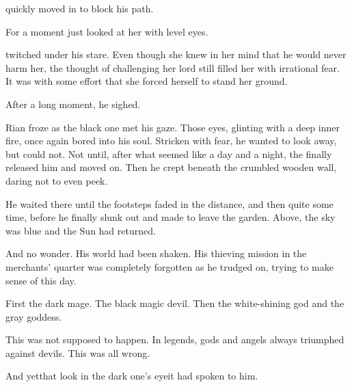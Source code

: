 \begin{garbage}
\Criseis{} quickly moved in to block his path.

For a moment \Ishnaruchaefir{} just looked at her with level eyes. 

\Criseis{} twitched under his stare. 
Even though she knew in her mind that he would never harm her, the thought of challenging her lord still filled her with irrational fear. 
It was with some effort that she forced herself to stand her ground.

After a long moment, he sighed. 





\begin{comment}
\subsubsection{Rian}
\end{comment}
\new
Rian froze as the black one met his gaze. Those eyes, glinting with a deep inner fire, once again bored into his soul. Stricken with fear, he wanted to look away, but could not. Not until, after what seemed like a day and a night, the \scatha{} finally released him and moved on. Then he crept beneath the crumbled wooden wall, daring not to even peek. 

He waited there until the footsteps faded in the distance, and then quite some time, before he finally slunk out and made to leave the garden. Above, the sky was blue and the Sun had returned. 


And no wonder. His world had been shaken. His thieving mission in the merchants' quarter was completely forgotten as he trudged on, trying to make sense of this day. 

First the dark mage. The black magic devil. Then the white-shining god and the gray goddess. 


This was not supposed to happen. In legends, gods and angels always triumphed against devils. This was all wrong. 

And yet\prikker that look in the dark one's eye\prikker it had spoken to him. 


\end{garbage}
